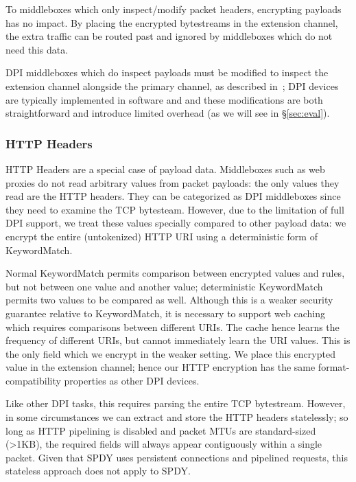  To middleboxes which only inspect/modify packet headers, encrypting payloads has no impact. 
By placing the encrypted bytestreams in the extension channel, the extra traffic can be routed past and ignored by middleboxes which do not need this data. %

DPI middleboxes which do inspect payloads must be modified to inspect the extension channel alongside the primary channel, as described in~\cite{blindbox}; DPI devices are typically implemented in software and and these modifications are both straightforward and introduce limited overhead (as we will see in \S\ref{sec:eval}). 

\subsubsection{HTTP Headers} 

HTTP Headers are a special case of payload data. Middleboxes such as web proxies do not read arbitrary values from packet payloads: the only values they read are the HTTP headers. They can be categorized as DPI middleboxes since they need to examine the TCP bytesteam. However, due to the limitation of full DPI support, we treat these values specially compared to other payload data: we encrypt the entire (untokenized) HTTP URI using a deterministic form of KeywordMatch.

Normal KeywordMatch permits comparison between encrypted values and rules, but not between one value and another value; deterministic KeywordMatch permits two values to be compared as well.
Although this is a weaker security guarantee relative to KeywordMatch, it is necessary to support web caching which requires comparisons between different URIs.
The cache hence learns the frequency of different URIs, but cannot immediately learn the URI values.
 This is the only field which we encrypt in the weaker setting.
We place this encrypted value in the extension channel; hence our HTTP encryption has the same format-compatibility properties as other DPI devices.

Like other DPI tasks, this requires parsing the entire TCP bytestream. However, in some circumstances we can extract and store the HTTP headers statelessly; so long as HTTP pipelining is disabled and packet MTUs are standard-sized (>1KB), the required fields will always appear contiguously within a single packet. Given that SPDY uses persistent connections and pipelined requests, this stateless approach does not apply to SPDY.


